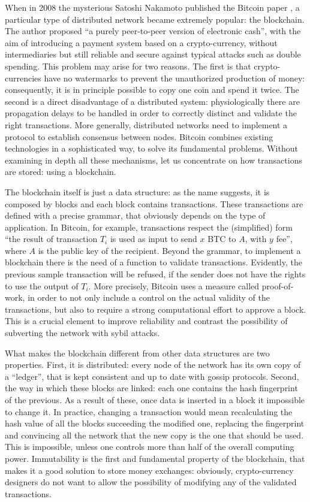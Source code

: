 When in 2008 the mysterious Satoshi Nakamoto published the Bitcoin paper \cite{bitcoin}, a particular type of distributed network became extremely popular: the blockchain. The author proposed ``a purely peer-to-peer version of electronic cash'', with the aim of introducing a payment system based on a crypto-currency, without intermediaries but still reliable and secure against typical attacks such as double spending. This problem may arise for two reasons. The first is that crypto-currencies have no watermarks to prevent the unauthorized production of money: consequently, it is in principle possible to copy one coin and spend it twice. The second is a direct disadvantage of a distributed system: physiologically there are propagation delays to be handled in order to correctly distinct and validate the right transactions. More generally, distributed networks need to implement a protocol to establish consensus between nodes.
Bitcoin combines existing technologies in a sophisticated way, to solve its fundamental problems. Without examining in depth all these mechanisms, let us concentrate on how transactions are stored: using a blockchain.

The blockchain itself is just a data structure: as the name suggests, it is composed by blocks and each block contains transactions. These transactions are defined with a precise grammar, that obviously depends on the type of application. In Bitcoin, for example, transactions respect the (simplified) form ``the result of transaction $T_i$ is used as input to send $x$ BTC to $A$, with $y$ fee'', where $A$ is the public key of the recipient. Beyond the grammar, to implement a blockchain there is the need of a function to validate transactions. Evidently, the previous sample transaction will be refused, if the sender does not have the rights to use the output of $T_i$. More precisely, Bitcoin uses a measure called proof-of-work, in order to not only include a control on the actual validity of the transactions, but also to require a strong computational effort to approve a block. This is a crucial element to improve reliability and contrast the possibility of subverting the network with sybil attacks. 

What makes the blockchain different from other data structures are two properties. First, it is distributed: every node of the network has its own copy of a ``ledger'', that is kept consistent and up to date with gossip protocols. Second, the way in which these blocks are linked: each one contains the hash fingerprint of the previous. As a result of these, once data is inserted in a block it impossible to change it. In practice, changing a transaction would mean recalculating the hash value of all the blocks succeeding the modified one, replacing the fingerprint and convincing all the network that the new copy is the one that should be used. This is impossible, unless one controls more than half of the overall computing power. Immutability is the first and fundamental property of the blockchain, that makes it a good solution to store money exchanges: obviously, crypto-currency designers do not want to allow the possibility of modifying any of the validated transactions.

